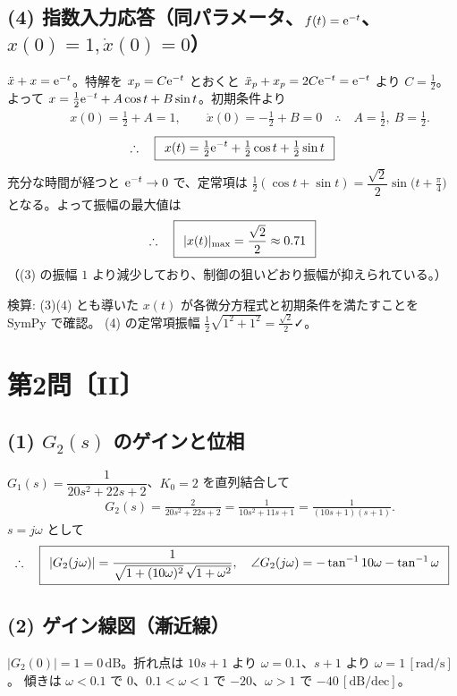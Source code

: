 \documentclass[11pt,a4paper]{article}
\begin{document}
\subsection*{(4) 指数入力応答（同パラメータ、$f(t)=\mathrm{e}^{-t}$、$x(0)=1,\dot x(0)=0$）}
$\ddot{x}+x=\mathrm{e}^{-t}$。特解を $x_p=C\mathrm{e}^{-t}$ とおくと $\ddot{x}_p+x_p=2C\mathrm{e}^{-t}=\mathrm{e}^{-t}$ より $C=\tfrac12$。
よって $x=\tfrac12\mathrm{e}^{-t}+A\cos t+B\sin t$。初期条件より
\begin{align*}
  &\qquad x(0)=\tfrac12+A=1,\qquad \dot{x}(0)=-\tfrac12+B=0
   \quad\therefore\quad A=\tfrac12,\ B=\tfrac12.
\end{align*}
\[
  \therefore\quad \boxed{\,\;x(t)=\tfrac12\mathrm{e}^{-t}+\tfrac12\cos t+\tfrac12\sin t\;\,}
\]
充分な時間が経つと $\mathrm{e}^{-t}\to0$ で、定常項は
$\tfrac12(\cos t+\sin t)=\dfrac{\sqrt2}{2}\sin\!\bigl(t+\tfrac{\pi}{4}\bigr)$ となる。よって振幅の最大値は
\[
  \therefore\quad \boxed{\,\;|x(t)|_{\max}=\dfrac{\sqrt2}{2}\approx0.71\;\,}
\]
（(3) の振幅 $1$ より減少しており、制御の狙いどおり振幅が抑えられている。）

\bigskip
\noindent 検算: (3)(4) とも導いた $x(t)$ が各微分方程式と初期条件を満たすことを SymPy で確認。
(4) の定常項振幅 $\tfrac12\sqrt{1^2+1^2}=\tfrac{\sqrt2}{2}$✓。

\newpage
\section*{第2問〔II〕}

\subsection*{(1) $G_2(s)$ のゲインと位相}
$G_1(s)=\dfrac{1}{20s^2+22s+2}$、$K_0=2$ を直列結合して
\begin{align*}
  &\qquad G_2(s)=\frac{2}{20s^2+22s+2}=\frac{1}{10s^2+11s+1}=\frac{1}{(10s+1)(s+1)}.
\end{align*}
$s=j\omega$ として
\[
  \therefore\quad \boxed{\,\;|G_2(j\omega)|=\dfrac{1}{\sqrt{1+(10\omega)^2}\,\sqrt{1+\omega^2}},\quad
  \angle G_2(j\omega)=-\tan^{-1}10\omega-\tan^{-1}\omega\;\,}
\]

\subsection*{(2) ゲイン線図（漸近線）}
$|G_2(0)|=1=0\,\mathrm{dB}$。折れ点は $10s+1$ より $\omega=0.1$、$s+1$ より $\omega=1\,[\mathrm{rad/s}]$。
傾きは $\omega<0.1$ で $0$、$0.1<\omega<1$ で $-20$、$\omega>1$ で $-40\,[\mathrm{dB/dec}]$。
\end{document}
